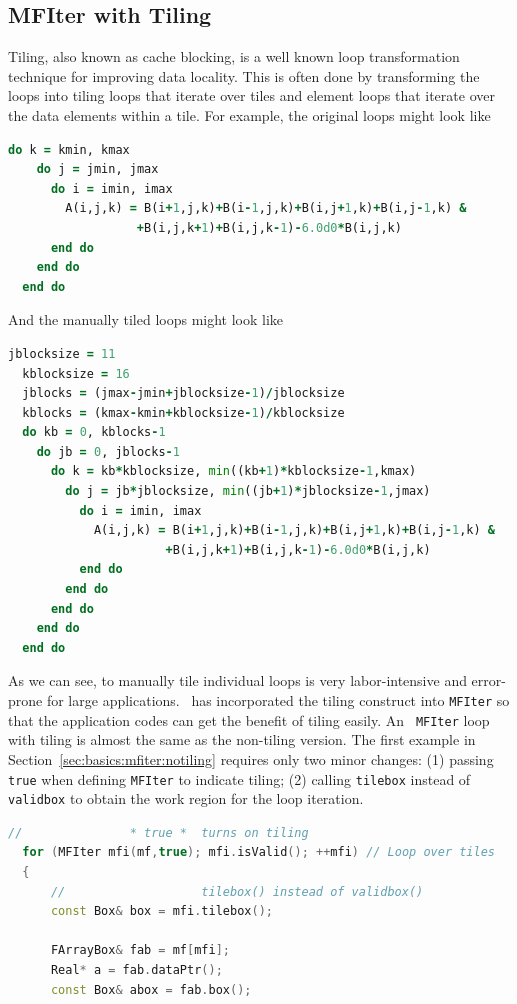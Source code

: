 {{\subsection{MFIter with Tiling}
\label{sec:basics:mfiter:tiling}

Tiling, also known as cache blocking, is a well known loop
transformation technique for improving data locality.  This is often
done by transforming the loops into tiling loops that iterate over
tiles and element loops that iterate over the data elements within a
tile.  For example, the original loops might look like
\begin{lstlisting}[language=fortran]
  do k = kmin, kmax
    do j = jmin, jmax
      do i = imin, imax
        A(i,j,k) = B(i+1,j,k)+B(i-1,j,k)+B(i,j+1,k)+B(i,j-1,k) &
                  +B(i,j,k+1)+B(i,j,k-1)-6.0d0*B(i,j,k)
      end do
    end do
  end do
\end{lstlisting}
And the manually tiled loops might look like
\begin{lstlisting}[language=fortran]
  jblocksize = 11
  kblocksize = 16
  jblocks = (jmax-jmin+jblocksize-1)/jblocksize
  kblocks = (kmax-kmin+kblocksize-1)/kblocksize
  do kb = 0, kblocks-1
    do jb = 0, jblocks-1
      do k = kb*kblocksize, min((kb+1)*kblocksize-1,kmax)
        do j = jb*jblocksize, min((jb+1)*jblocksize-1,jmax)
          do i = imin, imax
            A(i,j,k) = B(i+1,j,k)+B(i-1,j,k)+B(i,j+1,k)+B(i,j-1,k) &
                      +B(i,j,k+1)+B(i,j,k-1)-6.0d0*B(i,j,k)          
          end do
        end do
      end do
    end do
  end do
\end{lstlisting}
As we can see, to manually tile individual loops is very
labor-intensive and error-prone for large applications.  \amrex\ has
incorporated the tiling construct into {\tt MFIter} so that the
application codes can get the benefit of tiling easily.  An {\tt
  MFIter} loop with tiling is almost the same as the non-tiling
version.  The first example in
Section~\ref{sec:basics:mfiter:notiling} requires only two minor
changes: (1) passing {\tt true} when defining {\tt MFIter} to indicate
tiling; (2) calling {\tt tilebox} instead of {\tt validbox} to obtain
the work region for the loop iteration.
\begin{lstlisting}[language=cpp]
  //               * true *  turns on tiling
  for (MFIter mfi(mf,true); mfi.isValid(); ++mfi) // Loop over tiles
  {
      //                   tilebox() instead of validbox()
      const Box& box = mfi.tilebox();

      FArrayBox& fab = mf[mfi];
      Real* a = fab.dataPtr();
      const Box& abox = fab.box();


\end{lstlisting}}}

